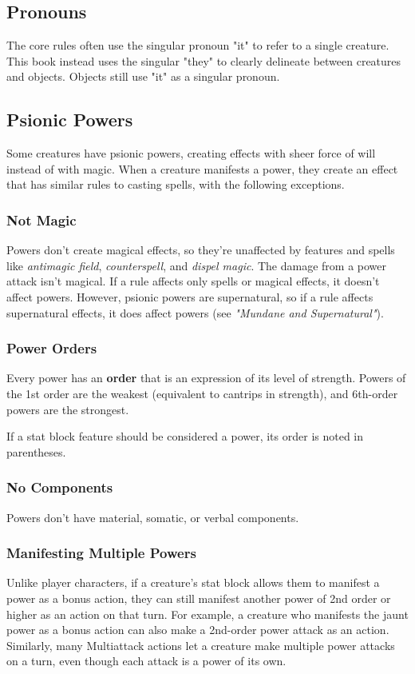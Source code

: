\documentclass[10pt,a4paper,twoside,bg=print,twocolumn,openany,nodeprecatedcode]{dndbook}
\begin{document}
\subsection{Pronouns}
The core rules often use the singular pronoun "it" to refer to a single creature. This book instead uses the singular "they" to clearly delineate between creatures and objects. Objects still use "it" as a singular pronoun.

\subsection{Psionic Powers}
Some creatures have psionic powers, creating effects with sheer force of will instead of with magic. When a creature manifests a power, they create an effect that has similar rules to casting spells, with the following exceptions.

\subsubsection{Not Magic}
Powers don't create magical effects, so they're unaffected by features and spells like \textit{antimagic field}, \textit{counterspell}, and \textit{dispel magic}. The damage from a power attack isn't magical. If a rule affects only spells or magical effects, it doesn't affect powers. However, psionic powers are supernatural, so if a rule affects supernatural effects, it does affect powers (see \textit{"Mundane and Supernatural"}).

\subsubsection{Power Orders}
Every power has an \textbf{order} that is an expression of its level of strength. Powers of the 1st order are the weakest (equivalent to cantrips in strength), and 6th-order powers are the strongest.

If a stat block feature should be considered a power, its order is noted in parentheses.

\subsubsection{No Components}
Powers don't have material, somatic, or verbal components.

\subsubsection{Manifesting Multiple Powers}
Unlike player characters, if a creature's stat block allows them to manifest a power as a bonus action, they can still manifest another power of 2nd order or higher as an action on that turn. For example, a creature who manifests the jaunt power as a bonus action can also make a 2nd-order power attack as an action. Similarly, many Multiattack actions let a creature make multiple power attacks on a turn, even though each attack is a power of its own.
\end{document}
